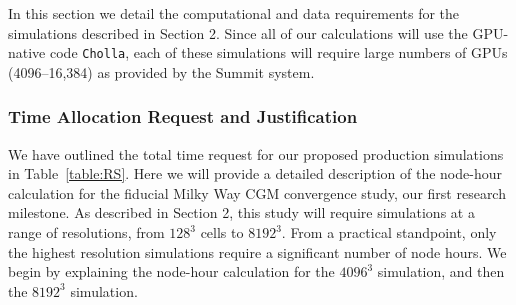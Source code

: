 \documentclass[11pt,letterpaper,english]{article}
\begin{document}



In this section we detail the computational and data requirements for the simulations described in Section 2. Since all of our calculations will use the GPU-native code {\tt Cholla}, each of these simulations will require large numbers of GPUs (4096--16,384) as provided by the Summit system. 

\vspace{-.25in}
\subsubsection{Time Allocation Request and Justification}
\vspace{-.25in}

We have outlined the total time request for our proposed production simulations in Table~\ref{table:RS}. Here we will provide a detailed description of the node-hour calculation for the fiducial Milky Way CGM convergence study, our first research milestone. As described in Section 2, this study will require simulations at a range of resolutions, from $128^3$ cells to $8192^3$. From a practical standpoint, only the highest resolution simulations require a significant number of node hours. We begin by explaining the node-hour calculation for the $4096^3$ simulation, and then the $8192^3$ simulation.



\end{document}
